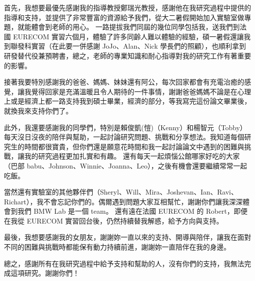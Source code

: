 首先，我想要最優先感謝我的指導教授鄭瑞光教授，感謝他在我研究過程中提供的指導和支持，並提供了非常豐富的資源給予我們，從大二暑假開始加入實驗室做專題，就能體會到老師的用心。
一路提拔我們同屆的幾位同學包括我，送我們到法國 EURECOM 實習六個月，體驗了許多同齡人難以體驗的經驗，碩一暑假還讓我到聯發科實習（在此要一併感謝 JoJo、Alan、Nick 學長們的照顧），也順利拿到研發替代役兼預聘書，總之，老師的專業知識和耐心指導對我的研究工作有著重要的影響。

接著我要特別感謝我的爸爸、媽媽、妹妹還有阿公，每次回家都會有充電治癒的感覺，讓我覺得回家是充滿溫暖且令人期待的一件事情，謝謝爸爸媽媽不論是在心理上或是經濟上都一路支持我到碩士畢業，經濟的部分，等我寫完這份論文畢業後，就換我來支持你們了。

此外，我還要感謝我的同學們，特別是賴俊凱(愷)（Kenny）和楊智元（Tobby）每天沒日沒夜的陪伴與幫助，一起討論研究問題、挑戰和分享想法。我知道每個研究生的時間都很寶貴，但你們還是願意花時間和我一起討論論文中遇到的困難與挑戰，讓我的研究過程更加扎實和有趣。
還有每天一起煩惱公館哪家好吃的大家（巴部 babu、Johnson、Winnie、Joanna、Leo），之後有機會還要繼續常常一起吃飯。

當然還有實驗室的其他夥伴們（Sheryl、Will、Mira、Joshevan、Ian、Ravi、Richart），我不會忘記你們的。偶爾遇到問題大家互相幫忙，謝謝你們讓我深深體會到我們 BMW Lab 是一個 team。
還有遠在法國 EURECOM 的 Robert，即便在我從 EURECOM 實習回台後，仍然持續替我解惑，給予方向與支持。

最後，我想要感謝我的女朋友，謝謝妳一直以來的支持、開導與陪伴，讓我在面對不同的困難與挑戰時都能保有動力持續前進，謝謝妳一直陪伴在我的身邊。

總之，感謝所有在我研究過程中給予支持和幫助的人，沒有你們的支持，我無法完成這項研究。謝謝你們！
